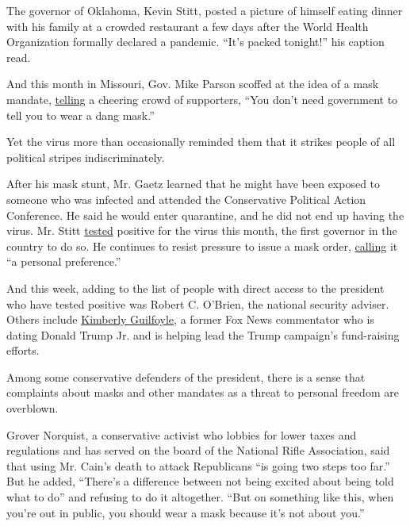 The governor of Oklahoma, Kevin Stitt, posted a picture of himself
eating dinner with his family at a crowded restaurant a few days after
the World Health Organization formally declared a pandemic. ``It's
packed tonight!'' his caption read.

And this month in Missouri, Gov. Mike Parson scoffed at the idea of a
mask mandate,
\href{https://www.stltoday.com/news/local/govt-and-politics/mixed-messages-despite-state-guidance-parson-goes-maskless-calls-coverings-dang-masks/article_b4023aa1-e4a3-522a-bbdf-280902abdd73.html}{telling}
a cheering crowd of supporters, ``You don't need government to tell you
to wear a dang mask.''

Yet the virus more than occasionally reminded them that it strikes
people of all political stripes indiscriminately.

After his mask stunt, Mr. Gaetz learned that he might have been exposed
to someone who was infected and attended the Conservative Political
Action Conference. He said he would enter quarantine, and he did not end
up having the virus. Mr. Stitt
\href{https://www.nytimes3xbfgragh.onion/2020/07/15/us/oklahoma-governor-coronavirus-stitt.html}{tested}
positive for the virus this month, the first governor in the country to
do so. He continues to resist pressure to issue a mask order,
\href{https://tulsaworld.com/news/state-and-regional/oklahoma-governor-wont-mandate-masks-to-me-thats-a-personal-preference/article_d45a63b6-20df-5282-89d7-1cdc60defdac.html}{calling}
it ``a personal preference.''

And this week, adding to the list of people with direct access to the
president who have tested positive was Robert C. O'Brien, the national
security adviser. Others include
\href{https://www.nytimes3xbfgragh.onion/2020/07/03/us/politics/kimberly-guilfoyle-trump-campaign-coronavirus.html}{Kimberly
Guilfoyle}, a former Fox News commentator who is dating Donald Trump Jr.
and is helping lead the Trump campaign's fund-raising efforts.

Among some conservative defenders of the president, there is a sense
that complaints about masks and other mandates as a threat to personal
freedom are overblown.

Grover Norquist, a conservative activist who lobbies for lower taxes and
regulations and has served on the board of the National Rifle
Association, said that using Mr. Cain's death to attack Republicans ``is
going two steps too far.'' But he added, ``There's a difference between
not being excited about being told what to do'' and refusing to do it
altogether. ``But on something like this, when you're out in public, you
should wear a mask because it's not about you.''


